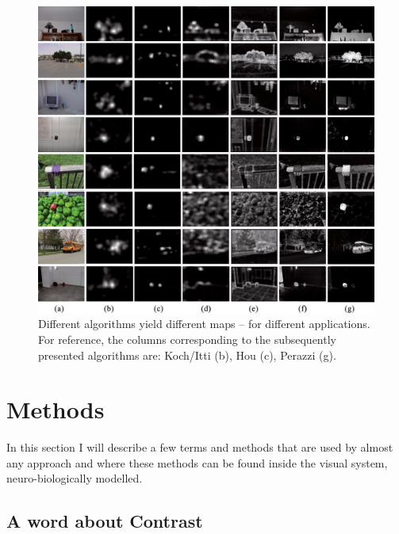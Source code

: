 \documentclass[a4paper,12pt,fleqn,oneside]{scrartcl}
\begin{document}
\begin{figure}[hbt]
    \centering
    \includegraphics[scale=0.8]{examples.png}

    \caption[\url{http://opticalengineering.spiedigitallibrary.org/data/Journals/OPTICE/23430/057008_1_6.png}]{Different
    algorithms yield different maps -- for different applications. For reference, the columns corresponding to
    the subsequently presented algorithms are: Koch/Itti (b), Hou (c), Perazzi (g).}
    \label{fig:examples}
\end{figure}


\section{Methods}

In this section I will describe a few terms and methods that are used by almost any approach and where these methods can
be found inside the visual system, neuro-biologically modelled.

\subsection{A word about Contrast}
\end{document}
